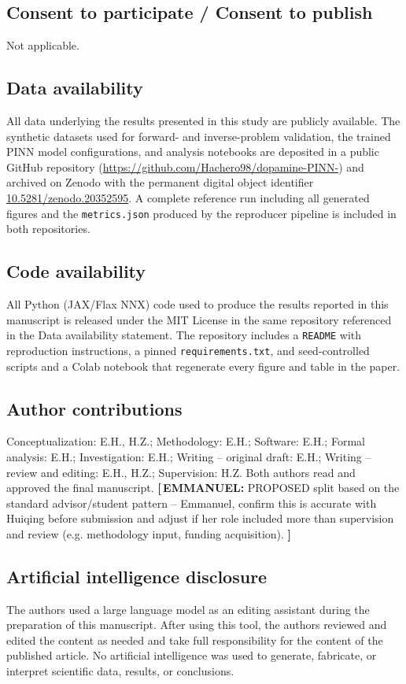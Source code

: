 \documentclass[12pt]{article}
\newcommand{\TODOi}[1]{\begingroup\color{red}\textbf{[\,EMMANUEL:\;} #1 \textbf{]}\endgroup}
\begin{document}
\subsection*{Consent to participate / Consent to publish}
Not applicable.

\subsection*{Data availability}
All data underlying the results presented in this study are
publicly available. The synthetic datasets used for forward-
and inverse-problem validation, the trained PINN model
configurations, and analysis notebooks are deposited in a
public GitHub repository
(\url{https://github.com/Hachero98/dopamine-PINN-}) and
archived on Zenodo with the permanent digital object identifier
\href{https://doi.org/10.5281/zenodo.20352595}{10.5281/zenodo.20352595}.
A complete reference run including all generated figures and
the \texttt{metrics.json} produced by the reproducer pipeline is
included in both repositories.

\subsection*{Code availability}
All Python (JAX/Flax NNX) code used to produce the results
reported in this manuscript is released under the MIT License
in the same repository referenced in the Data availability
statement. The repository includes a \texttt{README} with
reproduction instructions, a pinned \texttt{requirements.txt},
and seed-controlled scripts and a Colab notebook that
regenerate every figure and table in the paper.

\subsection*{Author contributions}
Conceptualization: E.H., H.Z.; Methodology: E.H.; Software: E.H.;
Formal analysis: E.H.; Investigation: E.H.; Writing -- original
draft: E.H.; Writing -- review and editing: E.H., H.Z.;
Supervision: H.Z. Both authors read and approved the final
manuscript.
\TODOi{PROPOSED split based on the standard advisor/student
pattern -- Emmanuel, confirm this is accurate with Huiqing before
submission and adjust if her role included more than supervision
and review (e.g. methodology input, funding acquisition).}

\subsection*{Artificial intelligence disclosure}
The authors used a large language model as an editing
assistant during the preparation of this manuscript. After
using this tool, the authors reviewed and edited the content
as needed and take full responsibility for the content of the
published article. No artificial intelligence was used to
generate, fabricate, or interpret scientific data, results,
or conclusions.



\end{document}

